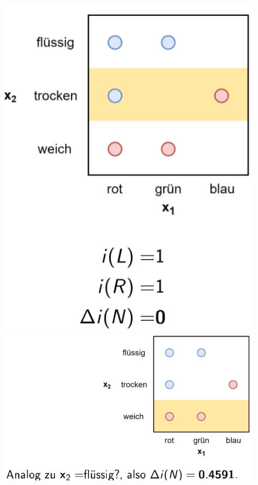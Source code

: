 \documentclass{report}
\begin{document}
  \begin{figure}[H]	
    \centering	
    \begin{minipage}[b]{0.4\textwidth}	
      \includegraphics[scale=.235]{ml07_12}	
    \end{minipage}	
    \begin{minipage}[b]{0.4\textwidth}	
      \includegraphics[scale=.235]{ml07_13}	
    \end{minipage}	
  \end{figure}	
  
\end{document}
